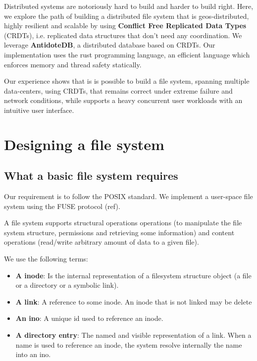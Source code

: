 \documentclass[sigplan, 10pt]{acmart}
\begin{document}
Distributed systems are notoriously hard to build and harder to
build right. Here, we explore the path of building a distributed file
system that is geos-distributed, highly resilient and scalable by using
\textbf{Conflict Free Replicated Data Types} (CRDTs), i.e. replicated
data structures that don't need any coordination. We leverage
\textbf{AntidoteDB}, a distributed database based
on CRDTs. Our implementation uses the rust programming language,
an efficient language which enforces memory and
thread safety statically.

Our experience shows that is is possible to build a file system, spanning multiple
data-centers, using CRDTs, that remains correct under extreme
failure and network conditions, while supports a heavy concurrent user
workloads with an intuitive user interface.

\section{Designing a file system}

\subsection{What a basic file system requires}

Our requirement is to follow the POSIX standard.  We implement
a user-space file system using the FUSE protocol (ref).

A file system supports structural operations operations (to manipulate the file system
structure, permissions and retrieving some information) and content operations
(read/write arbitrary amount of data to a given file).

We use the following terms:

\begin{itemize}
    \item \textbf{A inode}: Is the internal representation of a filesystem
    structure object (a file or a directory or a symbolic link).
    \item \textbf{A link}: A reference to some inode. An inode that is not
    linked may be delete
    \item \textbf{An ino}: A unique id used to reference an inode.
    \item \textbf{A directory entry}: The named and visible representation
    of a link. When a name is used to reference an inode,
    the system resolve internally the name into an ino.
\end{itemize}
\end{document}
